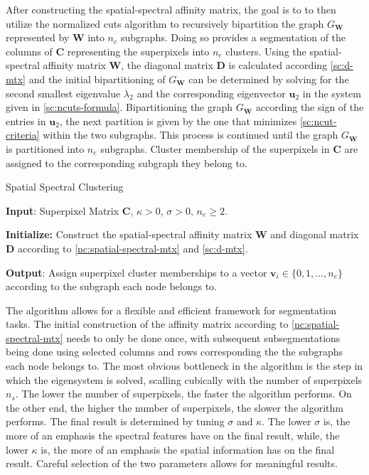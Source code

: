 After constructing the spatial-spectral affinity matrix, the goal is to to then utilize the normalized cuts algorithm to recursively bipartition the graph $G_\mathbf{W}$ represented by $\mathbf{W}$ into $n_e$ subgraphs. Doing so provides a segmentation of the columns of $\mathbf{C}$ representing the superpixels into $n_e$ clusters. Using the spatial-spectral affinity matrix $\mathbf{W}$, the diagonal matrix $\mathbf{D}$ is calculated according \eqref{sc:d-mtx} and the initial bipartitioning of $G_\mathbf{W}$ can be determined by solving for the second smallest eigenvalue $\lambda_2$ and the corresponding eigenvector $\mathbf{u}_2$ in the system given in \eqref{sc:ncuts-formula}. Bipartitioning the graph $G_\mathbf{W}$ according the sign of the entries in $\mathbf{u}_2$, the next partition is given by the one that minimizes \eqref{sc:ncut-criteria} within the two subgraphs. This process is continued until the graph $G_\mathbf{W}$ is partitioned into $n_e$ subgraphs. Cluster membership of the superpixels in $\mathbf{C}$ are assigned to the corresponding subgraph they belong to.

\begin{algorithm}[H]
    \caption{Spatial Spectral Clustering}
    \textbf{Input}: Superpixel Matrix $\mathbf{C}$, $\kappa > 0$, $\sigma > 0$, $n_e \geq 2$.

    \textbf{Initialize:} Construct the spatial-spectral affinity matrix $\mathbf{W}$ and diagonal matrix $\mathbf{D}$ according to \eqref{nc:spatial-spectral-mtx} and \eqref{sc:d-mtx}.\\


    \textbf{Output}: Assign superpixel cluster memberships to a vector $\mathbf{v}_i \in \{0,1,\dots,n_e\}$ according to the subgraph each node belongs to.
\end{algorithm}

The algorithm allows for a flexible and efficient framework for segmentation tasks. The initial construction of the affinity matrix according to \eqref{nc:spatial-spectral-mtx} needs to only be done once, with subsequent subsegmentations being done using selected columns and rows corresponding the the subgraphs each node belongs to. The most obvious bottleneck in the algorithm is the step in which the eigensystem is solved, scalling cubically with the number of superpixels $n_s$. The lower the number of superpixels, the faster the algorithm performs. On the other end, the higher the number of superpixels, the slower the algorithm performs. The final result is determined by tuning $\sigma$ and $\kappa$. The lower $\sigma$ is, the more of an emphasis the spectral features have on the final result, while, the lower $\kappa$ is, the more of an emphasis the spatial information has on the final result. Careful selection of the two parameters allows for meaningful results.
